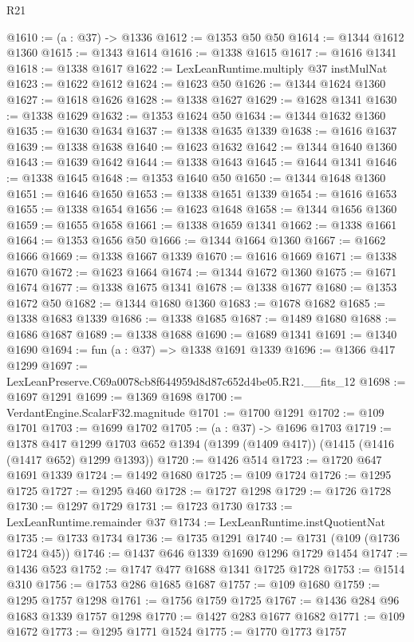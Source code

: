 \begin{lexlean}{R21}
\begin{coremodule}
@1610 := (a : @37) -> @1336
@1612 := @1353 @50 @50
@1614 := @1344 @1612 @1360
@1615 := @1343 @1614
@1616 := @1338 @1615
@1617 := @1616 @1341
@1618 := @1338 @1617
@1622 := LexLeanRuntime.multiply @37 instMulNat
@1623 := @1622 @1612
@1624 := @1623 @50
@1626 := @1344 @1624 @1360
@1627 := @1618 @1626
@1628 := @1338 @1627
@1629 := @1628 @1341
@1630 := @1338 @1629
@1632 := @1353 @1624 @50
@1634 := @1344 @1632 @1360
@1635 := @1630 @1634
@1637 := @1338 @1635 @1339
@1638 := @1616 @1637
@1639 := @1338 @1638
@1640 := @1623 @1632
@1642 := @1344 @1640 @1360
@1643 := @1639 @1642
@1644 := @1338 @1643
@1645 := @1644 @1341
@1646 := @1338 @1645
@1648 := @1353 @1640 @50
@1650 := @1344 @1648 @1360
@1651 := @1646 @1650
@1653 := @1338 @1651 @1339
@1654 := @1616 @1653
@1655 := @1338 @1654
@1656 := @1623 @1648
@1658 := @1344 @1656 @1360
@1659 := @1655 @1658
@1661 := @1338 @1659 @1341
@1662 := @1338 @1661
@1664 := @1353 @1656 @50
@1666 := @1344 @1664 @1360
@1667 := @1662 @1666
@1669 := @1338 @1667 @1339
@1670 := @1616 @1669
@1671 := @1338 @1670
@1672 := @1623 @1664
@1674 := @1344 @1672 @1360
@1675 := @1671 @1674
@1677 := @1338 @1675 @1341
@1678 := @1338 @1677
@1680 := @1353 @1672 @50
@1682 := @1344 @1680 @1360
@1683 := @1678 @1682
@1685 := @1338 @1683 @1339
@1686 := @1338 @1685
@1687 := @1489 @1680
@1688 := @1686 @1687
@1689 := @1338 @1688
@1690 := @1689 @1341
@1691 := @1340 @1690
@1694 := fun (a : @37) => @1338 @1691 @1339
@1696 := @1366 @417 @1299
@1697 := LexLeanPreserve.C69a0078cb8f644959d8d87c652d4be05.R21.__fits_12
@1698 := @1697 @1291
@1699 := @1369 @1698
@1700 := VerdantEngine.ScalarF32.magnitude
@1701 := @1700 @1291
@1702 := @109 @1701
@1703 := @1699 @1702
@1705 := (a : @37) -> @1696 @1703
@1719 := @1378
    @417
    @1299
    @1703
    @652
    @1394
    (@1399 (@1409 @417))
    (@1415 (@1416 (@1417 @652) @1299 @1393))
@1720 := @1426 @514
@1723 := @1720 @647 @1691 @1339
@1724 := @1492 @1680
@1725 := @109 @1724
@1726 := @1295 @1725
@1727 := @1295 @460
@1728 := @1727 @1298
@1729 := @1726 @1728
@1730 := @1297 @1729
@1731 := @1723 @1730
@1733 := LexLeanRuntime.remainder @37
@1734 := LexLeanRuntime.instQuotientNat
@1735 := @1733 @1734
@1736 := @1735 @1291
@1740 := @1731 (@109 (@1736 @1724 @45))
@1746 := @1437 @646 @1339 @1690 @1296 @1729 @1454
@1747 := @1436 @523
@1752 := @1747 @477 @1688 @1341 @1725 @1728
@1753 := @1514 @310
@1756 := @1753 @286 @1685 @1687
@1757 := @109 @1680
@1759 := @1295 @1757 @1298
@1761 := @1756 @1759 @1725
@1767 := @1436 @284 @96 @1683 @1339 @1757 @1298
@1770 := @1427 @283 @1677 @1682
@1771 := @109 @1672
@1773 := @1295 @1771 @1524
@1775 := @1770 @1773 @1757

\end{coremodule}
\end{lexlean}
